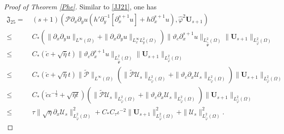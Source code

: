\documentclass{amsart}
\numberwithin{equation}{section}
\begin{document}
\begin{proof}[Proof of Theorem \ref{Phe}]
Similar to \eqref{JJ21}, one has
\begin{align}\label{JJ25}
\mathfrak{J}_{25}
=&~(s+1)(\mathcal{P}\partial_{x}\partial_{y}u(h'\partial_{y}^{-1}[\partial_{x}^{s+1}u]+h\partial_{x}^{s+1}u),\hat{\varphi}^{2}\mathbf{U}_{s+1})\\
\leq&~C_{*}\left(\|\partial_{x}\partial_{y}u\|_{L^{\infty}(\Omega)}+\|\partial_{x}\partial_{y}u\|_{L_{x}^{\infty}L_{y}^{2}(\Omega)}\right)
           \|\vartheta_{c}\partial_{x}^{s+1}u\|_{L_{\tilde{\hat{\Psi}}}^{2}(\Omega)}\|\mathbf{U}_{s+1}\|_{L_{\hat{\varphi}}^{2}(\Omega)}\nonumber\\
\leq&~C_{*}(\check{c}+\sqrt{\bar{\eta}}t)
      \|\vartheta_{c}\partial_{x}^{s+1}u\|_{L_{\tilde{\hat{\Psi}}}^{2}(\Omega)}\|\mathbf{U}_{s+1}\|_{L_{\hat{\varphi}}^{2}(\Omega)}\nonumber\\
\leq&~C_{*}(\check{c}+\sqrt{\bar{\eta}}t)\|\tilde{\mathcal{P}}\|_{L^{\infty}(\Omega)}
      \left(\|\tilde{\mathcal{P}}\mathcal{U}_{s}\|_{L_{\tilde{\varphi}}^{2}(\Omega)}+\|\vartheta_{c}\partial_{x}\mathcal{U}_{s}\|_{L_{\tilde{\varphi}}^{2}(\Omega)}\right)
      \|\mathbf{U}_{s+1}\|_{L_{\hat{\varphi}}^{2}(\Omega)}\nonumber\\
\leq&~C_{*}(\check{c}\iota^{-\frac{1}{2}}+\sqrt{\bar{\eta}t})
      \left(\|\tilde{\mathcal{P}}\mathcal{U}_{s}\|_{L_{\tilde{\varphi}}^{2}(\Omega)}+\|\vartheta_{c}\partial_{x}\mathcal{U}_{s}\|_{L_{\tilde{\varphi}}^{2}(\Omega)}\right)
      \|\mathbf{U}_{s+1}\|_{L_{\hat{\varphi}}^{2}(\Omega)}\nonumber\\
\leq&~\tau\|\sqrt{\eta}\partial_{x}\mathcal{U}_{s}\|_{L_{\tilde{\varphi}}^{2}(\Omega)}^{2}
     +C_{*}C_{\tau}\iota^{-2}\|\mathbf{U}_{s+1}\|_{L_{\hat{\varphi}}^{2}(\Omega)}^{2}
     +\|\mathcal{U}_{s}\|_{L_{\tilde{\varphi}}^{2}(\Omega)}^{2}.\nonumber
\end{align}


\end{proof}
\end{document}
